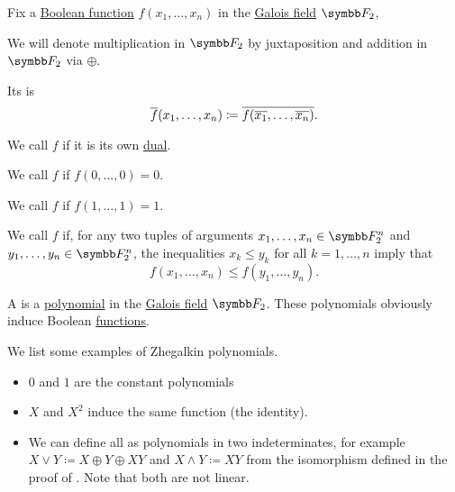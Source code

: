\begin{definition}\label{def:boolean_functions_in_f2}
  Fix a \hyperref[def:boolean_function]{Boolean function} \( f(x_1, \ldots, x_n) \) in the \hyperref[thm:galois_field_existence]{Galois field} \( \BF_2 \),

  We will denote multiplication in \( \BF_2 \) by juxtaposition and addition in \( \BF_2 \) via \( \oplus \).

  \begin{DefEnum}
     Its  is
    \begin{equation*}
      \overline{f}(x_1, \ldots, x_n) \coloneqq \overline{f(\overline{x_1}, \ldots, \overline{x_n})}.
    \end{equation*}

     We call \( f \)  if it is its own \hyperref[def:boolean_function_in_f2/dual]{dual}.

     We call \( f \)  if \( f(0, \ldots, 0) = 0 \).

     We call \( f \)  if \( f(1, \ldots, 1) = 1 \).

     We call \( f \)  if, for any two tuples of arguments \( x_1, \ldots, x_n \in \BF_2^n \) and \( y_1, \ldots, y_n \in \BF_2^n \), the inequalities \( x_k \leq y_k \) for all \( k = 1, \ldots, n \) imply that
    \begin{equation*}
      f(x_1, \ldots, x_n) \leq f(y_1, \ldots, y_n).
    \end{equation*}
  \end{DefEnum}
\end{definition}

\begin{definition}\label{def:zhegalkin_polynomial}
  A  is a \hyperref[def:polynomial]{polynomial} in the \hyperref[thm:galois_field_existence]{Galois field} \( \BF_2 \). These polynomials obviously induce Boolean \hyperref[def:boolean_function]{functions}.
\end{definition}

\begin{example}\label{ex:zhegalkin_polynomials}
  We list some examples of Zhegalkin polynomials.

  \begin{itemize}
    \item \( 0 \) and \( 1 \) are the constant polynomials
    \item \( X \) and \( X^2 \) induce the same function (the identity).
    \item We can define all  as polynomials in two indeterminates, for example \( X \vee Y \coloneqq X \oplus Y \oplus XY \) and \( X \wedge Y \coloneqq XY \) from the isomorphism defined in the proof of . Note that both are not linear.
  \end{itemize}
\end{example}

